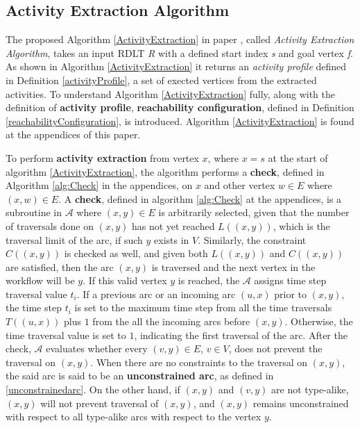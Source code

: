 \subsection*{Activity Extraction Algorithm}
The proposed Algorithm \ref{ActivityExtraction} in paper \cite{Malinao2017}, called \emph{Activity Extraction Algorithm}, takes an input RDLT \emph{R} with a defined start index \emph{s} and goal vertex \emph{f}. As shown in Algorithm \ref{ActivityExtraction} it returns an \emph{activity profile} defined in Definition \ref{activityProfile}, a set of exected vertices from the extracted activities. To understand Algorithm \ref{ActivityExtraction} fully, along with the definition of \textbf{activity profile}, \textbf{reachability configuration}, defined in  Definition \ref{reachabilityConfiguration}, is introduced. Algorithm \ref{ActivityExtraction} is found at the appendices of this paper. 

To perform \textbf{activity extraction} from vertex $x$, where $x = s$ at the start of algorithm \ref{ActivityExtraction}, the algorithm performs a \textbf{check}, defined in Algorithm \ref{alg:Check} in the appendices, on $x$ and other vertex $w \in E$  where $(x,w) \in E$. A \textbf{check}, defined in algorithm \ref{alg:Check} at the appendices, is a subroutine in $\mathcal A$ where $(x,y) \in E$ is arbitrarily selected, given that the number of traversals done on $(x,y)$ has not yet reached $L((x,y))$, which is the traversal limit of the arc, if such $y$ exists in $V$. Similarly, the constraint $C((x,y))$ is checked as well, and given both $L((x,y))$ and $C((x,y))$ are satisfied, then the arc $(x,y)$ is traversed and the next vertex in the workflow will be $y$. If this valid vertex $y$ is reached, the $\mathcal A$ assigns time step traversal value $t_i$. If a previous arc or an incoming arc $(u,x)$ prior to $(x,y)$, the time step $t_i$ is set to the maximum time step from all the time traversals $T((u,x))$ plus $1$ from the all the incoming arcs before $(x,y)$. Otherwise, the time traversal value is set to $1$, indicating the first traversal of the arc. 
After the check, $\mathcal A$ evaluates whether every $(v,y) \in E$, $v \in V$, does not prevent the traversal on $(x,y)$. When there are no constraints to the traversal on $(x,y)$, the said arc is said to be an \textbf{unconstrained arc}, as defined in \ref{unconstrainedarc}. On the other hand, if $(x,y)$ and $(v,y)$ are not type-alike, $(x,y)$ will not prevent traversal of $(x,y)$, and $(x,y)$ remains unconstrained with respect to all type-alike arcs with respect to the vertex $y$.


